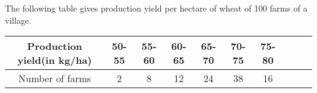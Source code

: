%
%
The following table gives production yield per hectare of wheat of 100 farms of a village.
\begin{tabular}{|c|c|c|c|c|c|c|c|c|c|}
\hline
Production yield(in kg/ha)&50-55&55-60&60-65&65-70&70-75&75-80
\\
\hline
Number of farms&2&8&12&24&38&16\\
\hline
\end{tabular}\\
%        
